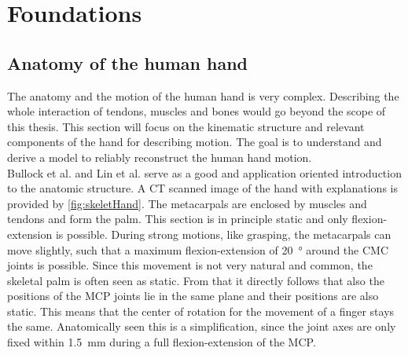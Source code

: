 
\lhead[\chaptername~\thechapter]{\rightmark}

\rhead[\leftmark]{}

\lfoot[\thepage]{}

\cfoot{}

\rfoot[]{\thepage}


\chapter{Foundations}
\label{cha:foundations}

\section{Anatomy of the human hand} \label{sec:anatomy}
The anatomy and the motion of the human hand is very complex. Describing the whole interaction of tendons, muscles and bones would go beyond the scope of this thesis. This section will focus on the kinematic structure and relevant components of the hand for describing motion. The goal is to understand and derive a model to reliably reconstruct the human hand motion.\\
Bullock et al. \cite{bullock2012assessing} and Lin et al. \cite{lin2000modeling} serve as a good and application oriented introduction to the anatomic structure. A \ac{CT} scanned image of the hand with explanations is provided by \ref{fig:skeletHand}. The metacarpals are enclosed by muscles and tendons and form the palm. This section is in principle static and only flexion-extension is possible. During strong motions, like grasping, the metacarpals can move slightly, such that a maximum flexion-extension of \SI{20}{\degree} around the \ac{CMC} joints is possible. Since this movement is not very natural and common, the skeletal palm is often seen as static. From that it directly follows that also the positions of the \ac{MCP} joints lie in the same plane and their positions are also static. This means that the center of rotation for the movement of a finger stays the same. Anatomically seen this is a simplification, since the joint axes are only fixed within \SI{1.5}{mm} during a full flexion-extension of the \ac{MCP}. 
